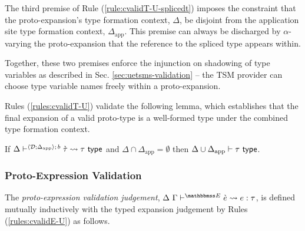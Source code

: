 The third premise of Rule (\ref{rule:cvalidT-U-splicedt}) imposes the constraint that the proto-expansion's type formation context, $\Delta$, be disjoint from the application site type formation context, $\Delta_\text{app}$. This premise can always be discharged by $\alpha$-varying the proto-expansion that the reference to the spliced type appears within. 

Together, these two premises enforce the injunction on {shadowing} of type variables as described in Sec. \ref{sec:uetsms-validation} -- the TSM provider can choose type variable names freely within a proto-expansion.%

Rules (\ref{rules:cvalidT-U}) validate the following lemma, which establishes that the final expansion of a valid proto-type is a well-formed type under the combined type formation context.
\begingroup
\def\thetheorem{\ref{lemma:candidate-expansion-type-validation}}
\begin{lemma}
If $\Delta\vdash^{\langle \mathcal{D}; \Delta_\text{app} \rangle;\,b} \grave{\tau} \leadsto \tau~\mathsf{type}$ and $\Delta \cap \Delta_\text{app}=\emptyset$ then ${\Delta}\cup{\Delta_\text{app}} \vdash \tau~\mathsf{type}$.
\end{lemma}
\endgroup

\subsubsection{Proto-Expression Validation}
The \emph{proto-expression validation judgement}, $\cvalidE{\Delta}{\Gamma}{\escenev}{\ce}{e}{\tau}$, is defined mutually inductively with the typed expansion judgement by Rules (\ref*{rules:cvalidE-U}) as follows.%

